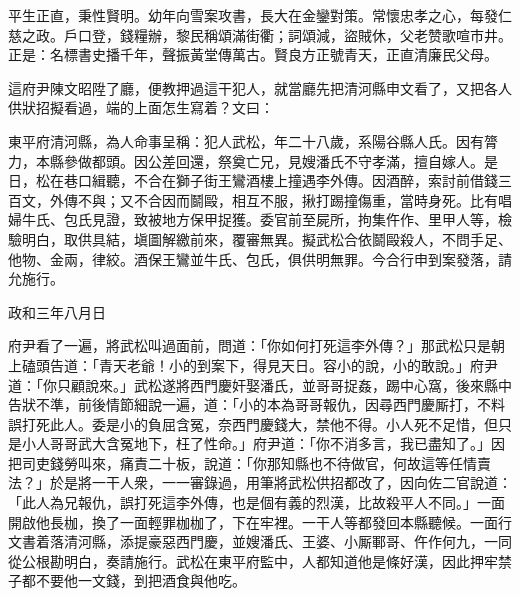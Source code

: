 \begin{myquote}
平生正直，秉性賢明。幼年向雪案攻書，長大在金鑾對策。常懷忠孝之心，每發仁慈之政。戶口登，錢糧辦，黎民稱頌滿街衢；詞頌減，盜賊休，父老赞歌喧市井。正是：名標書史播千年，聲振黃堂傳萬古。賢良方正號青天，正直清廉民父母。
\end{myquote}

這府尹陳文昭陞了廳，便教押過這干犯人，就當廳先把清河縣申文看了，又把各人供狀招擬看過，端的上面怎生寫着？文曰：

\begin{myquote}[\markfont]
東平府清河縣，為人命事呈稱：犯人武松，年二十八歲，系陽谷縣人氏。因有膂力，本縣參做都頭。因公差回還，祭奠亡兄，見嫂潘氏不守孝滿，擅自嫁人。是日，松在巷口緝聽，不合在獅子街王鸞酒樓上撞遇李外傳。因酒醉，索討前借錢三百文，{}外傳不與；又不合因而鬬毆，相互不服，揪打踢撞傷重，當時身死。比有唱婦牛氏、包氏見證，致被地方保甲捉獲。委官前至屍所，拘集仵作、里甲人等，檢驗明白，取供具結，塡圖解繳前來，覆審無異。擬武松合依鬬毆殺人，不問手足、他物、金兩，律絞。酒保王鸞並牛氏、包氏，俱供明無罪。今合行申到案發落，請允施行。

政和三年八月日


\end{myquote}

府尹看了一遍，將武松叫過面前，問道：「你如何打死這李外傳？」那武松只是朝上磕頭告道：「青天老爺！小的到案下，得見天日。容小的說，小的敢說。」府尹道：「你只顧說來。」武松遂將西門慶奸娶潘氏，並哥哥捉姦，踢中心窩，後來縣中告狀不準，前後情節細說一遍，道：「小的本為哥哥報仇，因尋西門慶厮打，不料誤打死此人。委是小的負屈含冤，奈西門慶錢大，禁他不得。小人死不足惜，但只是小人哥哥武大含冤地下，枉了性命。」府尹道：「你不消多言，我已盡知了。」因把司吏錢勞叫來，痛責二十板，說道：「你那知縣也不待做官，何故這等任情賣法？」於是將一干人衆，一一審錄過，用筆將武松供招都改了，因向佐二官說道：「此人為兄報仇，誤打死這李外傳，也是個有義的烈漢，比故殺平人不同。」一面開啟他長枷，換了一面輕罪枷枷了，下在牢裡。一干人等都發回本縣聽候。一面行文書着落清河縣，添提豪惡西門慶，並嫂潘氏、王婆、小厮鄆哥、仵作何九，一同從公根勘明白，奏請施行。武松在東平府監中，人都知道他是條好漢，因此押牢禁子都不要他一文錢，到把酒食與他吃。

